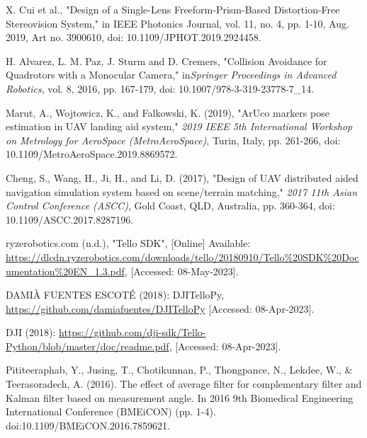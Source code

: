 \begin{flushleft}
\begin{thebibliography}{19}
X. Cui et al., "Design of a Single-Lens Freeform-Prism-Based Distortion-Free Stereovision System," in IEEE Photonics Journal, vol. 11, no. 4, pp. 1-10, Aug. 2019, Art no. 3900610, doi: 10.1109/JPHOT.2019.2924458.


 H. Alvarez, L. M. Paz, J. Sturm and D. Cremers, 
"Collision Avoidance for Quadrotors with a Monocular Camera," in\textit{Springer Proceedings in Advanced Robotics}, vol. 8, 2016, pp. 167-179, doi: 10.1007/978-3-319-23778-7\_14.


Marut, A., Wojtowicz, K., and Falkowski, K. (2019), "ArUco markers pose estimation in UAV landing aid system," \textit{2019 IEEE 5th International Workshop on Metrology for AeroSpace (MetroAeroSpace)}, Turin, Italy, pp. 261-266, doi: 10.1109/MetroAeroSpace.2019.8869572.

Cheng, S., Wang, H., Ji, H., and Li, D. (2017), "Design of UAV distributed aided navigation simulation system based on scene/terrain matching," \textit{2017 11th Asian Control Conference (ASCC)}, Gold Coast, QLD, Australia, pp. 360-364, doi: 10.1109/ASCC.2017.8287196.


ryzerobotics.com (n.d.), "Tello SDK", [Online] Available: \url{https://dlcdn.ryzerobotics.com/downloads/tello/20180910/Tello\%20SDK\%20Documentation\%20EN\_1.3.pdf}, [Accessed: 08-May-2023].

DAMIÀ FUENTES ESCOTÉ (2018): DJITelloPy, \url{https://github.com/damiafuentes/DJITelloPy} [Accessed: 08-Apr-2023].

DJI (2018): \url{https://github.com/dji-sdk/Tello-Python/blob/master/doc/readme.pdf}, [Accessed: 08-Apr-2023].
    

 Pititeeraphab, Y., Jusing, T., Chotikunnan, P., Thongpance, N., Lekdee, W., \& Teerasoradech, A. (2016). The effect of average filter for complementary filter and Kalman filter based on measurement angle. In 2016 9th Biomedical Engineering International Conference (BMEiCON) (pp. 1-4). doi:10.1109/BMEiCON.2016.7859621.


\end{thebibliography}
\end{flushleft}
